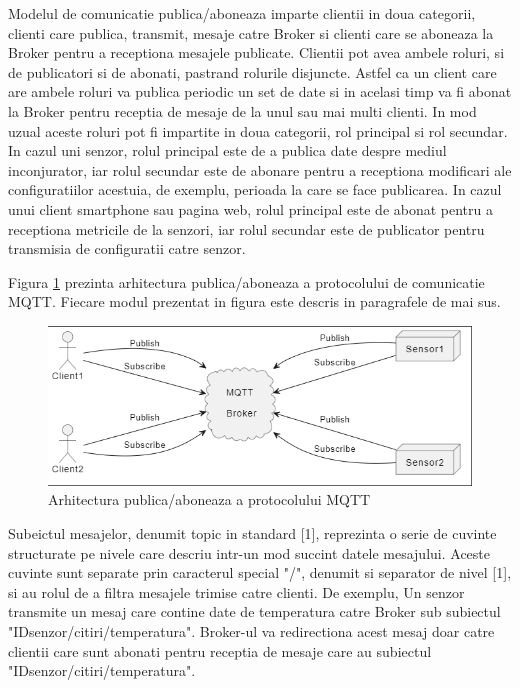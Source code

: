 Modelul de comunicatie publica/aboneaza imparte clientii in doua categorii, clienti care publica, transmit, mesaje catre Broker si clienti care se aboneaza
la Broker pentru a receptiona mesajele publicate. Clientii pot avea ambele roluri, si de publicatori si de abonati, pastrand rolurile disjuncte. Astfel ca 
un client care are ambele roluri va publica periodic un set de date si in acelasi timp va fi abonat la Broker pentru receptia de mesaje de la unul sau mai 
multi clienti. In mod uzual aceste roluri pot fi impartite in doua categorii, rol principal si rol secundar. In cazul uni senzor, rolul principal este 
de a publica date despre mediul inconjurator, iar rolul secundar este de abonare pentru a receptiona modificari ale configuratiilor acestuia, de exemplu, 
perioada la care se face publicarea. In cazul unui client smartphone sau pagina web, rolul principal este de abonat pentru a receptiona metricile de la senzori, 
iar rolul secundar este de publicator pentru transmisia de configuratii catre senzor.

Figura \ref{fig:MQTTBrokerArchitecture} prezinta arhitectura publica/aboneaza a protocolului de comunicatie MQTT. Fiecare modul prezentat in figura este 
descris in paragrafele de mai sus.
\begin{figure}[H]
    \centering
    \includegraphics[scale=0.8]{figs/MQTTBrokerArchitecture.png}
    \caption{Arhitectura publica/aboneaza a protocolului MQTT}
    \label{fig:MQTTBrokerArchitecture}
\end{figure}

Subeictul mesajelor, denumit topic in standard [1], reprezinta o serie de cuvinte structurate pe nivele care descriu intr-un mod succint datele mesajului. 
Aceste cuvinte sunt separate prin caracterul special "/", denumit si separator de nivel [1], si au rolul de a filtra mesajele trimise catre clienti. 
De exemplu, Un senzor transmite un mesaj care contine date de temperatura catre Broker sub subiectul "IDsenzor/citiri/temperatura". 
Broker-ul va redirectiona acest mesaj doar catre clientii care sunt abonati pentru receptia de mesaje care au subiectul "IDsenzor/citiri/temperatura".

